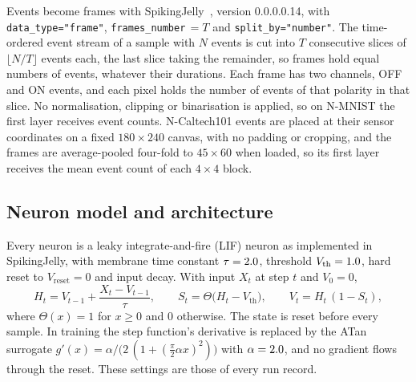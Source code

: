 \documentclass[10pt]{article}
\begin{document}
Events become frames with SpikingJelly~\citep{fang2023spikingjelly}, version 0.0.0.0.14, with %
\texttt{data\_type="frame"}, \texttt{frames\_number}$\,=T$ and \texttt{split\_by="number"}. The %
time-ordered event stream of a sample with $N$ events is cut into $T$ consecutive slices of
$\lfloor N/T\rfloor$ events each, the last slice taking the remainder, so frames hold equal
numbers of events, whatever their durations. Each frame has two channels, OFF and ON events, and
each pixel holds the number of events of that polarity in that slice. No normalisation,
clipping or binarisation is applied, so on N-MNIST the first layer receives event counts.
N-Caltech101 events are placed at their sensor coordinates on a fixed $180\times240$ canvas, with
no padding or cropping, and the frames are average-pooled four-fold to $45\times60$ when loaded,
so its first layer receives the mean event count of each $4\times4$ block. %

\subsection{Neuron model and architecture}
\label{sec:arch}

Every neuron is a leaky integrate-and-fire (LIF) neuron as implemented in SpikingJelly, with
membrane time constant $\tau=2.0$, threshold $V_{\mathrm{th}}=1.0$, hard reset to %
$V_{\mathrm{reset}}=0$ and input decay. With input $X_t$ at step $t$ and $V_0=0$,
\begin{equation}
\label{eq:lif}
H_t = V_{t-1} + \frac{X_t - V_{t-1}}{\tau}, \qquad
S_t = \Theta\big(H_t - V_{\mathrm{th}}\big), \qquad
V_t = H_t\,(1-S_t),
\end{equation}
where $\Theta(x)=1$ for $x\ge0$ and $0$ otherwise. The state is reset before every sample. In
training the step function's derivative is replaced by the ATan surrogate %
$g'(x)=\alpha/\big(2\,(1+(\tfrac{\pi}{2}\alpha x)^2)\big)$ with $\alpha=2.0$, and no %
gradient flows through the reset. These settings are those of every run record.
\end{document}
